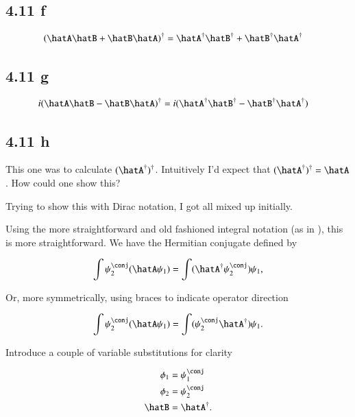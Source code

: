 \subsection{4.11 f}

\begin{align*}
(\hatA \hatB + \hatB \hatA)^\dagger &= \hatA^\dagger \hatB^\dagger + \hatB^\dagger \hatA^\dagger
\end{align*}

\subsection{4.11 g}

\begin{align*}
i (\hatA \hatB - \hatB \hatA)^\dagger &= i ( \hatA^\dagger \hatB^\dagger - \hatB^\dagger \hatA^\dagger)
\end{align*}

\subsection{4.11 h}

This one was to calculate $(\hatA^\dagger)^\dagger$.  Intuitively I'd expect that $(\hatA^\dagger)^\dagger = \hatA$.  How could one show this?

Trying to show this with Dirac notation, I got all mixed up initially.

Using the more straightforward and old fashioned integral notation (as in \citep{bohm1989qt}), this is more straightforward.  We have the Hermitian conjugate defined by

\begin{align*}
\int \psi_2^\conj (\hatA \psi_1) = \int (\hatA^\dagger \psi_2^\conj) \psi_1,
\end{align*}

Or, more symmetrically, using braces to indicate operator direction

\begin{align*}
\int \psi_2^\conj (\hatA \psi_1) = \int (\psi_2^\conj \hatA^\dagger) \psi_1.
\end{align*}

Introduce a couple of variable substitutions for clarity

\begin{align*}
\phi_1 &= \psi_1^\conj \\
\phi_2 &= \psi_2^\conj \\
\hatB &= \hatA^\dagger.
\end{align*}

